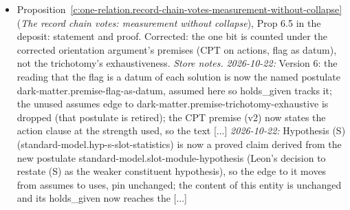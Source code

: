 \documentclass[11pt]{article}
\theoremstyle{definition}
\theoremstyle{plain}
\begin{document}
\begin{itemize}
\item Proposition~\ref{c:one-relation.record-chain-votes-measurement-without-collapse} (\emph{The record chain votes: measurement without collapse}), Prop 6.5 in the deposit: statement and proof. Corrected: the one bit is counted under the corrected orientation argument's premises (CPT on actions, flag as datum), not the trichotomy's exhaustiveness. \emph{Store notes.} \emph{2026-10-22:} Version 6: the reading that the flag is a datum of each solution is now the named postulate dark-matter.premise-flag-as-datum, assumed here so holds\_given tracks it; the unused assumes edge to dark-matter.premise-trichotomy-exhaustive is dropped (that postulate is retired); the CPT premise (v2) now states the action clause at the strength used, so the text [...] \emph{2026-10-22:} Hypothesis (S) (standard-model.hyp-s-slot-statistics) is now a proved claim derived from the new postulate standard-model.slot-module-hypothesis (Leon's decision to restate (S) as the weaker constituent hypothesis), so the edge to it moves from assumes to uses, pin unchanged; the content of this entity is unchanged and its holds\_given now reaches the [...]
\end{itemize}
\end{document}
